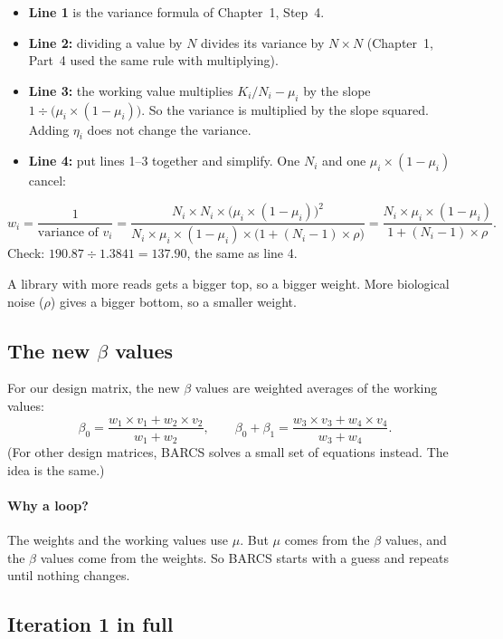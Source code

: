 \begin{itemize}
\item \textbf{Line 1} is the variance formula of Chapter~1, Step~4.
\item \textbf{Line 2:} dividing a value by $N$ divides its variance by
  $N \times N$ (Chapter~1, Part~4 used the same rule with multiplying).
\item \textbf{Line 3:} the working value multiplies $K_i/N_i - \mu_i$ by the
  slope $1 \div \bigl(\mu_i \times (1-\mu_i)\bigr)$. So the variance is
  multiplied by the slope squared. Adding $\eta_i$ does not change the
  variance.
\item \textbf{Line 4:} put lines 1--3 together and simplify. One
  $N_i$ and one $\mu_i \times (1-\mu_i)$ cancel:
\end{itemize}
\[
w_i = \frac{1}{\text{variance of } v_i}
 = \frac{N_i \times N_i \times \bigl(\mu_i \times (1-\mu_i)\bigr)^2}
        {N_i \times \mu_i \times (1-\mu_i) \times \bigl(1 + (N_i-1) \times \rho\bigr)}
 = \frac{N_i \times \mu_i \times (1-\mu_i)}{1 + (N_i - 1) \times \rho} .
\]
Check: $190.87 \div 1.3841 = 137.90$, the same as line 4.

A library with more reads gets a bigger top, so a bigger weight. More
biological noise ($\rho$) gives a bigger bottom, so a smaller weight.

\subsection{The new \texorpdfstring{$\beta$}{beta} values}

For our design matrix, the new $\beta$ values are weighted averages of the
working values:
\[
\beta_0 = \frac{w_1 \times v_1 + w_2 \times v_2}{w_1 + w_2}, \qquad
\beta_0 + \beta_1 = \frac{w_3 \times v_3 + w_4 \times v_4}{w_3 + w_4}.
\]
(For other design matrices, BARCS solves a small set of equations instead.
The idea is the same.)

\paragraph{Why a loop?} The weights and the working values use $\mu$. But
$\mu$ comes from the $\beta$ values, and the $\beta$ values come from the
weights. So BARCS starts with a guess and repeats until nothing changes.

\subsection{Iteration 1 in full}

